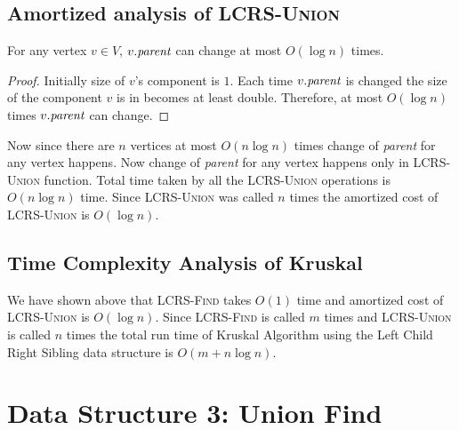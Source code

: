 \subsection{Amortized analysis of \textsc{LCRS-Union}}
\begin{lemma}{}{}
For any vertex $v\in V$, $v.\emph{parent}$ can change at most $O(\log n)$ times.
\end{lemma}
\begin{proof}
Initially size of $v$'s component is $1$. Each time $v.\emph{parent}$ is changed the size of the component $v$ is in becomes at least double. Therefore, at most $O(\log n)$ times $v.\emph{parent}$ can change. 
\end{proof}\parinn

Now since there are $n$ vertices at most $O(n\log n)$ times change of \emph{parent} for any vertex happens. Now change of \emph{parent} for any vertex happens only in \textsc{LCRS-Union} function. Total time taken by all the \textsc{LCRS-Union} operations is $O(n\log n)$ time. Since \textsc{LCRS-Union} was called $n$ times the amortized cost of \textsc{LCRS-Union} is $O(\log n)$.
\subsection{Time Complexity Analysis of Kruskal}
We have shown above that \textsc{LCRS-Find} takes $O(1)$ time and amortized cost of \textsc{LCRS-Union} is $O(\log n)$. Since \textsc{LCRS-Find} is called $m$ times and \textsc{LCRS-Union} is called $n$ times the total run time of Kruskal Algorithm using the Left Child Right Sibling data structure is $O(m+n\log n)$. 
\section{Data Structure 3: Union Find}
